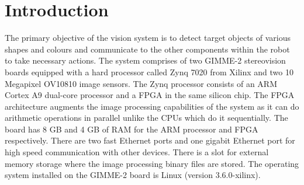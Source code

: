 \section{Introduction}\label{sec:introduction}
The primary objective of the vision system is to detect target objects of various shapes and colours and communicate to the other components within the robot to take necessary actions. The system comprises of two GIMME-2 stereovision boards equipped with a hard processor called Zynq 7020 from Xilinx and two 10 Megapixel OV10810 image sensors. The Zynq processor consists of an ARM Cortex A9 dual-core processor and a FPGA in the same silicon chip. The FPGA architecture augments the image processing capabilities of the system as it can do arithmetic operations in parallel unlike the CPUs which do it sequentially. The board has 8 GB and 4 GB of RAM for the ARM processor and FPGA respectively. There are two fast Ethernet ports and one gigabit Ethernet port for high speed communication with other devices. There is a slot for external memory storage where the image processing binary files are stored. The operating system installed on the GIMME-2 board is Linux (version 3.6.0-xilinx). 

